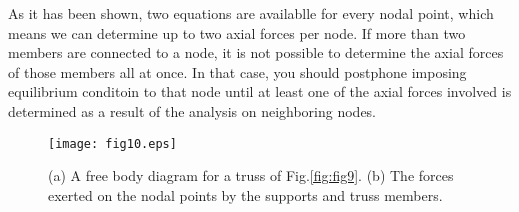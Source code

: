 \documentclass[10pt,a4j]{article}
\begin{document}
As it has been shown, two equations are availablle for every nodal point, which 
means we can determine up to two axial forces per node. 
If more than two members are connected to a node, it is not possible to 
determine the axial forces of those members all at once. 
In that case, you should postphone imposing equilibrium conditoin to that 
node until at least one of the axial forces involved is determined 
as a result of the analysis on neighboring nodes. 
\begin{figure}[h]
	\begin{center}
	\texttt{[image: fig10.eps]} 
	\end{center}
	\caption{(a) A free body diagram for a truss of Fig.\ref{fig:fig9}. 
	(b) The forces exerted on the nodal points by the supports and truss members.} 
	\label{fig:fig10}
\end{figure}
\end{document}

